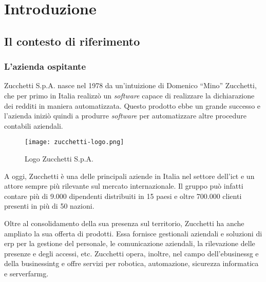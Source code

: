 \chapter{Introduzione}
\label{cap:introduzione}

\section{Il contesto di riferimento}
\subsection{L'azienda ospitante}
Zucchetti S.p.A. nasce nel 1978 da un'intuizione di Domenico ``Mino'' Zucchetti, 
che per primo in Italia realizzò un \emph{software} capace di realizzare la dichiarazione
dei redditi in maniera automatizzata.
Questo prodotto ebbe un grande successo e l'azienda iniziò quindi a produrre
\emph{software} per automatizzare altre procedure contabili aziendali.

\begin{figure}[h!] 
    \centering 
    \texttt{[image: zucchetti-logo.png]} 
    \caption{Logo Zucchetti S.p.A.}
\end{figure}

\noindent A oggi, Zucchetti è una delle principali aziende in Italia nel settore dell'\gls{ict} e un attore sempre 
più rilevante sul mercato internazionale.
Il gruppo può infatti contare più di 9.000 dipendenti distribuiti in 15 paesi 
e oltre 700.000 clienti presenti in più di 50 nazioni.

Oltre al consolidamento della sua presenza sul territorio, Zucchetti ha anche 
ampliato la sua offerta di prodotti.
Essa fornisce gestionali aziendali e soluzioni di \gls{erp}
per la gestione del personale, le comunicazione aziendali, la rilevazione delle 
presenze e degli accessi, etc. 
Zucchetti opera, inoltre, nel campo dell'\gls{ebusinessg} e della \gls{businessintg} e
offre servizi per robotica, automazione, sicurezza informatica e \gls{serverfarmg}.

